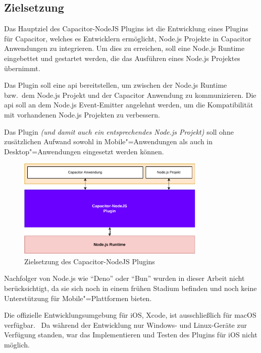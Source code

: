 \subsection{Zielsetzung}

Das Hauptziel des Capacitor-NodeJS Plugins ist die Entwicklung eines Plugins für Capacitor, welches es Entwicklern ermöglicht, Node.js Projekte in Capacitor Anwendungen zu integrieren.
Um dies zu erreichen, soll eine Node.js Runtime eingebettet und gestartet werden, die das Ausführen eines Node.js Projektes übernimmt.

Das Plugin soll eine \ac{api} bereitstellen, um zwischen der Node.js Runtime bzw.\ dem Node.js Projekt und der Capacitor Anwendung zu kommunizieren.
Die \ac{api} soll an dem Node.js Event-Emitter angelehnt werden, um die Kompatibilität mit vorhandenen Node.js Projekten zu verbessern.

Das Plugin \textit{(und damit auch ein entsprechendes Node.js Projekt)} soll ohne zusätzlichen Aufwand sowohl in Mobile"=Anwendungen als auch in Desktop"=Anwendungen eingesetzt werden können.

\vspace{1em}

\begin{figure}[h]
  \centering
  \includegraphics[width=0.8\textwidth]{assets/02_Capacitor-NodeJS/01_Zielsetzung.drawio.pdf}
  \caption[Capacitor-NodeJS / Zielsetzung]{Zielsetzung des Capacitor-NodeJS Plugins}
\end{figure}

Nachfolger von Node.js wie \enquote{Deno} oder \enquote{Bun} wurden in dieser Arbeit nicht berücksichtigt, da sie sich noch in einem frühen Stadium befinden und noch keine Unterstützung für Mobile"=Plattformen bieten.
\cite{deno, bun}

\begin{note}
  Die offizielle Entwicklungsumgebung für iOS, Xcode, ist ausschließlich für macOS verfügbar.~\cite{xcode:support}
  Da während der Entwicklung nur Windows- und Linux-Geräte zur Verfügung standen, war das Implementieren und Testen des Plugins für iOS nicht möglich.
\end{note}
